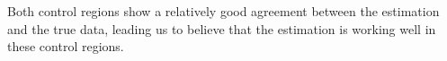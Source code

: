 Both control regions show a relatively good agreement between the estimation and the true data, leading us to believe that the estimation is working well in these control regions. 






